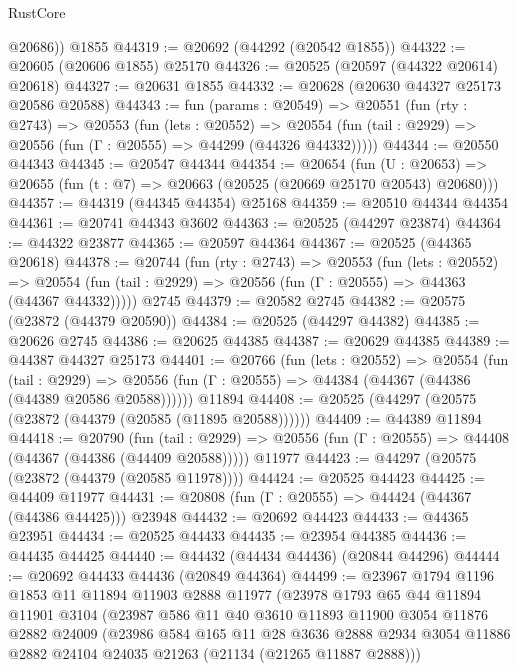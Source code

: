 \begin{lexlean}{RustCore}
\begin{coremodule}
        @20686))
    @1855
@44319 := @20692 (@44292 (@20542 @1855))
@44322 := @20605 (@20606 @1855) @25170
@44326 := @20525 (@20597 (@44322 @20614) @20618)
@44327 := @20631 @1855
@44332 := @20628 (@20630 @44327 @25173 @20586 @20588)
@44343 := fun (params : @20549) =>
  @20551
    (fun (rty : @2743) =>
    @20553
      (fun (lets : @20552) =>
      @20554 (fun (tail : @2929) => @20556 (fun (Γ : @20555) => @44299 (@44326 @44332)))))
@44344 := @20550 @44343
@44345 := @20547 @44344
@44354 := @20654
    (fun (U : @20653) => @20655 (fun (t : @7) => @20663 (@20525 (@20669 @25170 @20543) @20680)))
@44357 := @44319 (@44345 @44354) @25168
@44359 := @20510 @44344 @44354
@44361 := @20741 @44343 @3602
@44363 := @20525 (@44297 @23874)
@44364 := @44322 @23877
@44365 := @20597 @44364
@44367 := @20525 (@44365 @20618)
@44378 := @20744
    (fun (rty : @2743) =>
    @20553
      (fun (lets : @20552) =>
      @20554 (fun (tail : @2929) => @20556 (fun (Γ : @20555) => @44363 (@44367 @44332)))))
    @2745
@44379 := @20582 @2745
@44382 := @20575 (@23872 (@44379 @20590))
@44384 := @20525 (@44297 @44382)
@44385 := @20626 @2745
@44386 := @20625 @44385
@44387 := @20629 @44385
@44389 := @44387 @44327 @25173
@44401 := @20766
    (fun (lets : @20552) =>
    @20554
      (fun (tail : @2929) =>
      @20556 (fun (Γ : @20555) => @44384 (@44367 (@44386 (@44389 @20586 @20588))))))
    @11894
@44408 := @20525 (@44297 (@20575 (@23872 (@44379 (@20585 (@11895 @20588))))))
@44409 := @44389 @11894
@44418 := @20790
    (fun (tail : @2929) => @20556 (fun (Γ : @20555) => @44408 (@44367 (@44386 (@44409 @20588)))))
    @11977
@44423 := @44297 (@20575 (@23872 (@44379 (@20585 @11978))))
@44424 := @20525 @44423
@44425 := @44409 @11977
@44431 := @20808 (fun (Γ : @20555) => @44424 (@44367 (@44386 @44425))) @23948
@44432 := @20692 @44423
@44433 := @44365 @23951
@44434 := @20525 @44433
@44435 := @23954 @44385
@44436 := @44435 @44425
@44440 := @44432 (@44434 @44436) (@20844 @44296)
@44444 := @20692 @44433 @44436 (@20849 @44364)
@44499 := @23967
    @1794
    @1196
    @1853
    @11
    @11894
    @11903
    @2888
    @11977
    (@23978
      @1793
      @65
      @44
      @11894
      @11901
      @3104
      (@23987
        @586
        @11
        @40
        @3610
        @11893
        @11900
        @3054
        @11876
        @2882
        @24009
        (@23986
          @584
          @165
          @11
          @28
          @3636
          @2888
          @2934
          @3054
          @11886
          @2882
          @24104
          @24035
          @21263
          (@21134 (@21265 @11887 @2888)))

\end{coremodule}
\end{lexlean}
